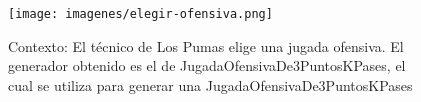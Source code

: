 \newpage
\begin{landscape}

\begin{figure}[h!]
   \texttt{[image: imagenes/elegir-ofensiva.png]}
   \caption{Contexto: El técnico de Los Pumas elige una jugada ofensiva. El generador obtenido es el de JugadaOfensivaDe3PuntosKPases, el cual se utiliza para
   generar una JugadaOfensivaDe3PuntosKPases}
\end{figure}

\end{landscape}
\newpage

